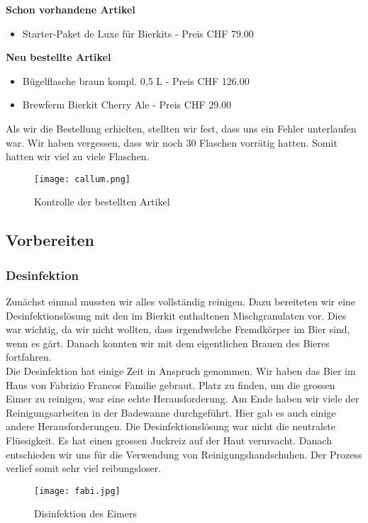 \textbf{Schon vorhandene Artikel}
\begin{itemize}
	\item Starter-Paket de Luxe für Bierkits - Preis CHF 79.00
\end{itemize}
\textbf{Neu bestellte Artikel}
\begin{itemize}
	\item Bügelflasche braun kompl. 0,5 L - Preis CHF 126.00
	\item Brewferm Bierkit Cherry Ale - Preis CHF 29.00
\end{itemize}

Als wir die Bestellung erhielten, stellten wir fest, dass uns ein Fehler unterlaufen war.
Wir haben vergessen, dass wir noch 30 Flaschen vorrätig hatten.
Somit hatten wir viel zu viele Flaschen.

 \begin{figure}[!h]
	\centering
	\texttt{[image: callum.png]}
	\caption{Kontrolle der bestellten Artikel}
\end{figure}
\newpage
\subsection{Vorbereiten}
\subsubsection{Desinfektion}
Zunächst einmal mussten wir alles vollständig reinigen.
Dazu bereiteten wir eine Desinfektionslösung mit den im Bierkit enthaltenen Mischgranulaten vor.
Dies war wichtig, da wir nicht wollten, dass irgendwelche Fremdkörper im Bier sind, wenn es gärt.
Danach konnten wir mit dem eigentlichen Brauen des Bieres fortfahren. \\

Die Desinfektion hat einige Zeit in Anspruch genommen. Wir haben das Bier im Haus von Fabrizio Francos Familie gebraut.
Platz zu finden, um die grossen Eimer zu reinigen,
war eine echte Herausforderung. Am Ende haben wir viele der Reinigungsarbeiten in der Badewanne durchgeführt.
Hier gab es auch einige andere Herausforderungen. Die Desinfektionslösung war nicht die neutralste Flüssigkeit.
Es hat einen grossen Juckreiz auf der Haut verursacht. Danach entschieden wir uns für die Verwendung von Reinigungshandschuhen.
Der Prozess verlief somit sehr viel reibungsloser.


\begin{figure}[!h]
	\centering
	\texttt{[image: fabi.jpg]}
	\caption{Disinfektion des Eimers}
\end{figure}

